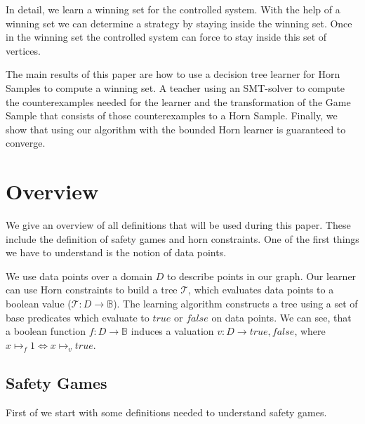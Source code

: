 \documentclass[10pt,a4paper]{article}
\theoremstyle{plain}
\theoremstyle{definition}
\begin{document}
In detail, we learn a winning set for the controlled system.  With the help of a winning set we can determine a strategy by staying inside the winning set. Once in the winning set the controlled system can force to stay inside this set of vertices. 

The main results of this paper are how to use a decision tree learner for Horn Samples to compute a winning set. A teacher using an SMT-solver to compute the counterexamples needed for the learner and the transformation of the Game Sample that consists of those counterexamples to a Horn Sample. Finally, we show that using our algorithm with the bounded Horn learner is guaranteed to converge.



\section{Overview}
We give an overview of all definitions that will be used during this paper. These include the definition of safety games and horn constraints. One of the first things we have to understand is the notion of data points.
 
We use data points over a domain $D$ to describe points in our graph. Our learner can use Horn constraints to build a tree $\mathcal{T}$, which evaluates data points to a boolean value ($\mathcal{T}:D \to \mathbb{B}$). The learning algorithm constructs a tree using a set of base predicates which evaluate to $true$ or $false$ on data points.
We can see, that a boolean function $f: D \to \mathbb{B}$ induces a valuation $v: D \to {true,false}$, where $x \mapsto_f 1 \iff x\mapsto_v true$.
\subsection{Safety Games}

First of we start with some definitions needed to understand safety games.
\end{document}
